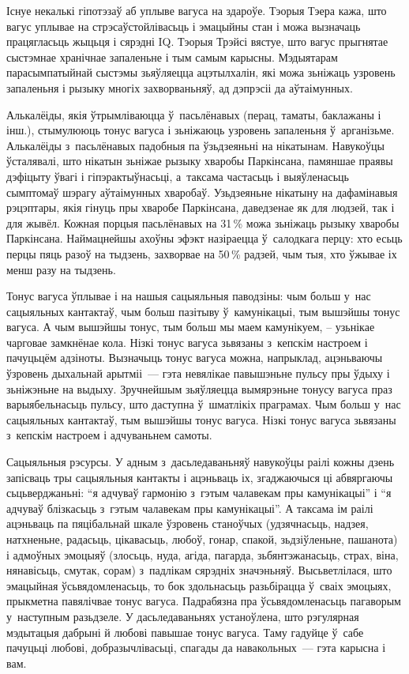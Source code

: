 Існуе некалькі гіпотэзаў аб уплыве вагуса на здароўе. Тэорыя Тэера кажа, што вагус уплывае на стрэсаўстойлівасьць і эмацыйны стан і можа вызначаць працягласьць жыцьця і сярэдні IQ. Тэорыя Трэйсі вястуе, што вагус прыгнятае сыстэмнае хранічнае запаленьне і тым самым карысны. Мэдыятарам парасымпатыйнай сыстэмы зьяўляецца ацэтылхалін, які можа зьніжаць узровень запаленьня і рызыку многіх захворваньняў, ад дэпрэсіі да аўтаімунных.

Алькалёіды, якія ўтрымліваюцца ў~пасьлёнавых (перац, таматы, баклажаны і інш.), стымулююць тонус вагуса і зьніжаюць узровень запаленьня ў~арганізьме. Алькалёіды з~пасьлёнавых падобныя па ўзьдзеяньні на нікатынам. Навукоўцы ўсталявалі, што нікатын зьніжае рызыку хваробы Паркінсана, памяншае праявы дэфіцыту ўвагі і гіпэрактыўнасьці, а~таксама частасьць і выяўленасьць сымптомаў шэрагу аўтаімунных хваробаў. Узьдзеяньне нікатыну на дафамінавыя рэцэптары, якія гінуць пры хваробе Паркінсана, даведзенае як для людзей, так і для жывёл. Кожная порцыя пасьлёнавых на 31\,\% можа зьніжаць рызыку хваробы Паркінсана. Наймацнейшы ахоўны эфэкт назіраецца ў~салодкага перцу: хто есьць перцы пяць разоў на тыдзень, захворвае на 50\,\% радзей, чым тыя, хто ўжывае іх менш разу на тыдзень.

Тонус вагуса ўплывае і на нашыя сацыяльныя паводзіны: чым больш у~нас сацыяльных кантактаў, чым больш пазітыву ў~камунікацыі, тым вышэйшы тонус вагуса. А чым вышэйшы тонус, тым больш мы маем камунікуем, -- узьнікае чарговае замкнёнае кола. Нізкі тонус вагуса зьвязаны з~кепскім настроем і пачуцьцём адзіноты. Вызначыць тонус вагуса можна, напрыклад, ацэньваючы ўзровень дыхальнай арытміі~--- гэта невялікае павышэньне пульсу пры ўдыху і зьніжэньне на выдыху. Зручнейшым зьяўляецца вымярэньне тонусу вагуса праз варыябельнасьць пульсу, што даступна ў~шматлікіх праграмах. Чым больш у~нас сацыяльных кантактаў, тым вышэйшы тонус вагуса. Нізкі тонус вагуса зьвязаны з~кепскім настроем і адчуваньнем самоты.

Сацыяльныя рэсурсы. У адным з~дасьледаваньняў навукоўцы раілі кожны дзень запісваць тры сацыяльныя кантакты і ацэньваць іх, згаджаючыся ці абвяргаючы сьцьверджаньні: ``я адчуваў гармонію з~гэтым чалавекам пры камунікацыі'' і ``я адчуваў блізкасьць з~гэтым чалавекам пры камунікацыі''. А таксама ім раілі ацэньваць па пяцібальнай шкале ўзровень станоўчых (удзячнасьць, надзея, натхненьне, радасьць, цікавасьць, любоў, гонар, спакой, зьдзіўленьне, пашанота) і адмоўных эмоцыяў (злосьць, нуда, агіда, пагарда, зьбянтэжанасьць, страх, віна, нянавісьць, смутак, сорам) з~падлікам сярэдніх значэньняў. Высьветлілася, што эмацыйная ўсьвядомленасьць, то бок здольнасьць разьбірацца ў~сваіх эмоцыях, прыкметна павялічвае тонус вагуса. Падрабязна пра ўсьвядомленасьць пагаворым у~наступным разьдзеле. У дасьледаваньнях устаноўлена, што рэгулярная мэдытацыя дабрыні й любові павышае тонус вагуса. Таму гадуйце ў~сабе пачуцьці любові, добразычлівасьці, спагады да навакольных~--- гэта карысна і вам.


